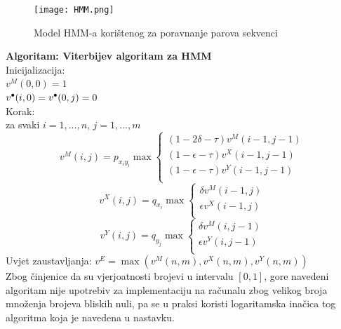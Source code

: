\documentclass[a4paper]{article}
\newcommand\tab[1][1cm]{\hspace*{#1}}
\newcommand\sbullet[1][.5]{\mathbin{\vcenter{\hbox{\scalebox{#1}{$\bullet$}}}}}
\begin{document}
\begin{figure}[H]
  \texttt{[image: HMM.png]}
  \caption{Model HMM-a korištenog za poravnanje parova sekvenci}
  \label{fig:hmm}
\end{figure}


\textbf{Algoritam: Viterbijev algoritam za HMM} \cite{hmm_algorithms}\\
Inicijalizacija: \\
\tab \tab $v^M(0,0) = 1$\\
\tab \tab $v^{\sbullet[.75]}(i,0) = v^{\sbullet[.75]}(0,j) = 0$\\
Korak:\\
\tab za svaki $i=1,...,n$, $j=1,...,m$ \\
\begin{equation}
     v^M(i,j) = p_{x_iy_i} \max
    \begin{cases}
      (1 - 2\delta - \tau)v^M(i-1,j-1)\\
      (1-\epsilon-\tau)v^X(i-1,j-1)\\
      (1-\epsilon - \tau)v^Y(i-1,j-1)\\          
    \end{cases}
\end{equation}
\begin{equation}
     v^X(i,j) = q_{x_i}\max
    \begin{cases}
      \delta v^M(i-1,j)\\
      \epsilon v^X(i-1,j)\\
    \end{cases}   
\end{equation}
\begin{equation}
     v^Y(i,j) = q_{y_j}\max
    \begin{cases}
      \delta v^M(i,j-1)\\
      \epsilon v^Y(i,j-1)\\
    \end{cases}   
\end{equation}
Uvjet zaustavljanja:
$v^E = \max(v^M(n,m), v^X(n,m), v^Y(n,m))$ \\

Zbog činjenice da su vjerjoatnosti brojevi u intervalu $[0,1]$, gore navedeni algoritam nije upotrebiv za implementaciju na računalu zbog velikog broja množenja brojeva bliskih nuli, pa se u praksi koristi logaritamska inačica tog algoritma koja je navedena u nastavku.  
\end{document}
